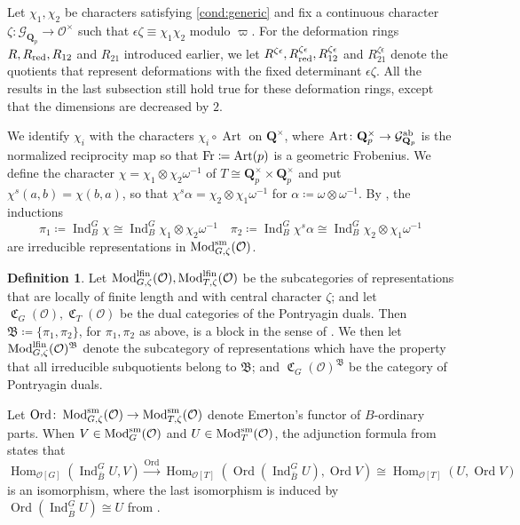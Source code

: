 \documentclass[leqno]{amsart}
\theoremstyle{definition}
\newtheorem{defn}[thm]{Definition}
\theoremstyle{remark}
\newcommand{\oo}{\mathcal{O}}
\newcommand{\Q}{{\mathbf{Q}}}
\newcommand{\Qp}{\mathbf{Q}_p}
\DeclareMathOperator{\Hom}{Hom}
\DeclareMathOperator{\Ind}{Ind}
\DeclareMathOperator{\Art}{Art}
\newcommand{\Fr}{\textnormal{Fr}} %
\DeclareMathOperator{\Mod}{\textnormal{Mod}}
\DeclareMathOperator{\fC}{\mathfrak{C}} %
\DeclareMathOperator{\Ord}{Ord} %
\newcommand{\Gp}{\mathcal{G}_{\Qp}} %
\newcommand{\B}{\mathfrak B} %
\newcommand{\sm}{\textnormal{sm}}
\newcommand{\lfin}{\textnormal{lfin}}
\newcommand{\red}{\textnormal{red}}
\begin{document}
Let $\chi_1,\chi_2$ be characters satisfying
\eqref{cond:generic} and fix a continuous character 
$\zeta\colon \Gp\to \oo^\times$
such that $\epsilon\zeta\equiv \chi_1\chi_2$ 
modulo $\varpi$.
For the deformation rings
$R, R_{\red}, R_{12}$ and $R_{21}$
introduced earlier, we let 
$R^{\zeta\epsilon}, R^{\zeta\epsilon}_{\red}, 
R^{\zeta\epsilon}_{12}$ and $R^{\zeta\epsilon}_{21}$
denote the quotients that represent
deformations with the
fixed determinant $\epsilon\zeta$.
All the results in the last subsection
still hold true for these deformation rings,
except that the dimensions are decreased by $2$.

We identify $\chi_i$ with the characters
$\chi_i\circ \Art$ on $\Q^\times$,
where $\Art\colon \Qp^\times\to \Gp^{\textnormal{ab}}$
is the normalized reciprocity map
so that $\Fr\coloneqq \Art(p)$
is a geometric Frobenius.
We define the character
$\chi=\chi_1\otimes\chi_2\omega^{-1}$
of $T\cong \Qp^\times\times\Qp^\times$
and put $\chi^s(a,b)=\chi(b,a)$, so that 
$\chi^s\alpha=\chi_2\otimes \chi_1\omega^{-1}$
for $\alpha\coloneqq \omega\otimes\omega^{-1}$.
By \cite[Thm 30]{barthel},
the inductions
\[
\pi_1\coloneqq \Ind_{B}^G\chi\cong
\Ind_{B}^G\chi_1\otimes\chi_2\omega^{-1}\quad
\pi_2\coloneqq \Ind_{B}^G\chi^s\alpha\cong 
\Ind_{B}^G\chi_2\otimes\chi_1\omega^{-1} 
\]
are irreducible representations
in $\Mod^{\sm}_{G,\zeta}(\oo)$.

\begin{defn}\label{def:block}
Let $\Mod^{\lfin}_{G,\zeta}(\oo), \Mod^{\lfin}_{T,\zeta}(\oo)$
be the subcategories
of representations that are 
locally of finite length 
and with central character $\zeta$;
and let $\fC_G(\oo), \fC_T(\oo)$
be the dual categories
of the Pontryagin duals.
Then $\B\coloneqq\{\pi_1,\pi_2\}$,
for $\pi_1,\pi_2$ as above, is a block 
in the sense of \cite[\S 5]{pask}.
We then let $\Mod^{\lfin}_{G,\zeta}(\oo)^\B$
denote the subcategory
of representations which have the property that
all irreducible subquotients belong to $\B$;
and $\fC_G(\oo)^\B$
be the category of Pontryagin duals.
\end{defn}

Let $\Ord\colon \Mod_{G,\zeta}^{\sm}(\oo)
\to \Mod_{T,\zeta}^{\sm}(\oo)$
denote Emerton's functor of $B$-ordinary parts.
When $V\in \Mod^{\sm}_G(\oo)$ and
$U\in \Mod^{\sm}_T(\oo)$,
the adjunction formula
from \cite[Thm 4.4.6]{emeI} states that
\begin{equation}\label{eq:adjunct}
	\Hom_{\oo[G]}(\Ind_{\bar{B}}^GU,V)
	\xrightarrow{\Ord}
	\Hom_{\oo[T]}(\Ord(\Ind_{\bar{B}}^GU),\Ord V)
	\cong
	\Hom_{\oo[T]}(U,\Ord V)
\end{equation}
is an isomorphism, where the last isomorphism
is induced by $\Ord(\Ind_{\bar{B}}^GU)\cong U$
from  \cite[Prop 4.3.4]{emeI}.
\end{document}
